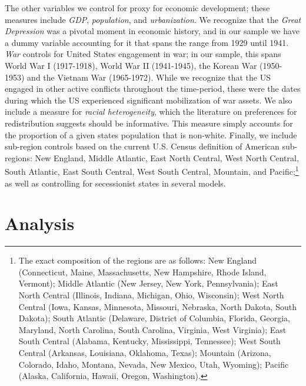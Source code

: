 \documentclass[letter, 12pt]{article}
\begin{document}
The other variables we control for proxy for economic development; these measures include \emph{GDP}, \emph{population}, and \emph{urbanization}. We recognize that the \emph{Great Depression} was a pivotal moment in economic history, and in our sample we have a dummy variable accounting for it that spans the range from 1929 until 1941. \emph{War} controls for United States engagement in war; in our sample, this spans World War I (1917-1918), World War II (1941-1945), the Korean War (1950-1953) and the Vietnam War (1965-1972). While we recognize that the US engaged in other active conflicts throughout the time-period, these were the dates during which the US experienced significant mobilization of war assets. We also include a measure for \textit{racial heterogeneity}, which the literature on preferences for redistribution suggests should be informative. This measure simply accounts for the proportion of a given states population that is non-white. Finally, we include sub-region controls based on the current U.S. Census definition of American sub-regions: New England, Middle Atlantic, East North Central, West North Central, South Atlantic, East South Central, West South Central, Mountain, and Pacific;\footnote{The exact composition of the regions are as follows: New England (Connecticut, Maine, Massachusetts, New Hampshire, Rhode Island, Vermont); Middle Atlantic (New Jersey, New York, Pennsylvania); East North Central (Illinois, Indiana, Michigan, Ohio, Wisconsin); West North Central (Iowa, Kansas, Minnesota, Missouri, Nebraska, North Dakota, South Dakota); South Atlantic (Delaware, District of Columbia, Florida, Georgia, Maryland, North Carolina, South Carolina, Virginia, West Virginia); East South Central (Alabama, Kentucky, Mississippi, Tennessee); West South Central (Arkansas, Louisiana, Oklahoma, Texas); Mountain (Arizona, Colorado, Idaho, Montana, Nevada, New Mexico, Utah, Wyoming); Pacific (Alaska, California, Hawaii, Oregon, Washington).} as well as controlling for secessionist states in several models.

\section{Analysis}
\end{document}
